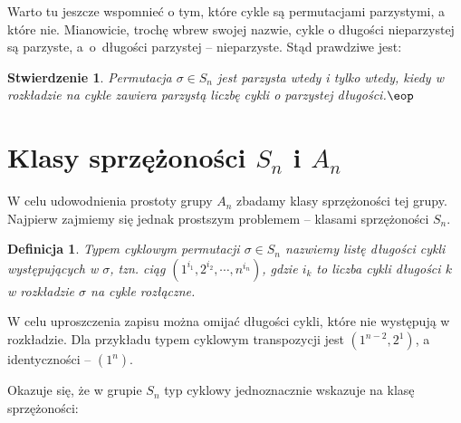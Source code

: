 \documentclass[licencjacka]{pracamgr}
\newtheorem{deff}{Definicja}[section]
\newtheorem{fact}{Stwierdzenie}[section]
\begin{document}
Warto tu jeszcze wspomnieć o tym, które cykle są permutacjami
parzystymi, a które nie. Mianowicie, trochę wbrew swojej nazwie,
cykle o długości nieparzystej są parzyste, a~o~długości parzystej --
nieparzyste. Stąd prawdziwe jest:

\begin{fact}\label{fact_typ_A_n}
    Permutacja $\sigma \in S_n$ jest parzysta wtedy i tylko wtedy, kiedy w rozkładzie na cykle
    zawiera parzystą liczbę cykli o parzystej długości.\quad$\eop$
\end{fact}


\section{Klasy sprzężoności $S_n$ i $A_n$}

W celu udowodnienia prostoty grupy $A_n$ zbadamy klasy
sprzężoności tej grupy. Najpierw zajmiemy się jednak prostszym
problemem -- klasami sprzężoności $S_n$.

\begin{deff}
    \emph{Typem cyklowym} permutacji $\sigma \in S_n$ nazwiemy listę długości cykli występujących w $\sigma$,
    tzn. ciąg $(1^{i_1}, 2^{i_2}, \cdots, n^{i_n})$,
    gdzie $i_k$ to liczba cykli długości $k$ w rozkładzie $\sigma$ na cykle rozłączne.
\end{deff}
W celu uproszczenia zapisu można omijać długości cykli, które nie
występują w rozkładzie. Dla przykładu typem cyklowym transpozycji
jest $(1^{n-2}, 2^1)$, a identyczności -- $(1^n)$.

Okazuje się, że w grupie $S_n$ typ cyklowy jednoznacznie wskazuje na
klasę sprzężoności:
\end{document}
